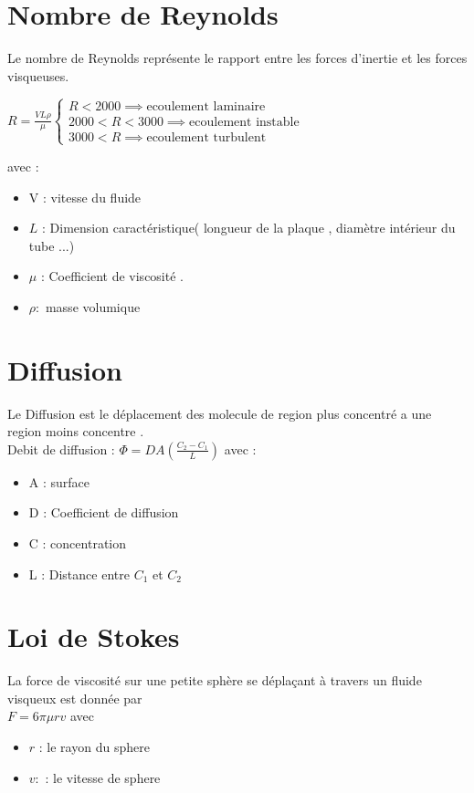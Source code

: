 \documentclass[12pt,oneside]{book}
\begin{document}
\section{Nombre de Reynolds}
Le nombre de Reynolds représente le rapport entre les forces d'inertie et les forces visqueuses. \\
\begin{center}
	$ R = \frac{V L \rho}{\mu}   $\qquad  $ \begin{cases}
			R < 2000 \implies \text{ecoulement laminaire}       \\
			2000 < R < 3000 \implies \text{ecoulement instable} \\
			3000 < R \implies \text{ecoulement turbulent}
		\end{cases} $
\end{center}
avec :\begin{itemize}
	\item V : vitesse du fluide
	\item $ L$ : Dimension caractéristique( longueur de la plaque , diamètre intérieur du tube ...)
	\item $ \mu $ : Coefficient de viscosité .
	\item $ \rho : $ masse volumique
\end{itemize}
\section{Diffusion}
Le Diffusion est le déplacement des molecule de region plus concentré a une region moins concentre . \\
Debit de diffusion :  $\Phi = DA(\frac{C_2- C_1}{L})  $ avec : \begin{itemize}
	\item A : surface
	\item D : Coefficient de diffusion
	\item C : concentration
	\item L : Distance entre $ C_1 $ et $ C_2 $
\end{itemize}
\section{Loi de Stokes}
La force de viscosité sur une petite sphère se déplaçant à travers un fluide visqueux est donnée par \\
$ \boxed{F = 6\pi \mu rv }$ avec \begin{itemize}
	\item $r$ : le rayon du sphere
	\item $ v: $ : le vitesse de sphere
\end{itemize}
\end{document}
